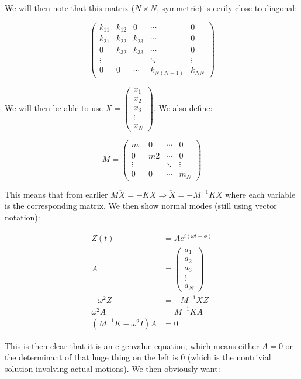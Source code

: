 \documentclass{report}
\begin{document}
We will then note that this matrix ($N \times N$, symmetric) is eerily close to diagonal:

$$\begin{pmatrix}
k_{11} & k_{12} & 0 & \cdots & 0\\
k_{21} & k_{22} & k_{23} & \cdots & 0\\
0 & k_{32} & k_{33} & \cdots & 0\\
\vdots &&& \ddots & \vdots\\
0 & 0 & \cdots & k_{N(N-1)} & k_{NN}
\end{pmatrix}$$

We will then be able to use $X = \begin{pmatrix}x_1\\x_2\\x_3\\ \vdots \\ x_N\end{pmatrix}$. We also define:

$$M = \begin{pmatrix}m_1 & 0 & \cdots & 0\\
 0 & m2 & \cdots & 0\\ 
 \vdots && \ddots&\vdots \\ 
 0 &0&\cdots& m_N
 \end{pmatrix}$$

This means that from earlier $M \ddot{X} = -KX \Rightarrow \ddot{X} = -M^{-1}KX$ where each variable is the corresponding matrix. We then show normal modes (still using vector notation):

\begin{align*}
Z(t) &=Ae^{i(\omega t + \phi)}\\
A &= \begin{pmatrix}a_1\\a_2\\a_3\\\vdots\\a_N\end{pmatrix}\\
-\omega^2Z&= -M^{-1}XZ\\
\omega^2A &= M^{-1}KA\\[12.0pt]
(M^{-1}K - \omega^2I)A &= 0
\end{align*}

This is then clear that it is an eigenvalue equation, which means either $A = 0$ or the determinant of that huge thing on the left is $0$ (which is the nontrivial solution involving actual motions). We then obviously want:
\end{document}
